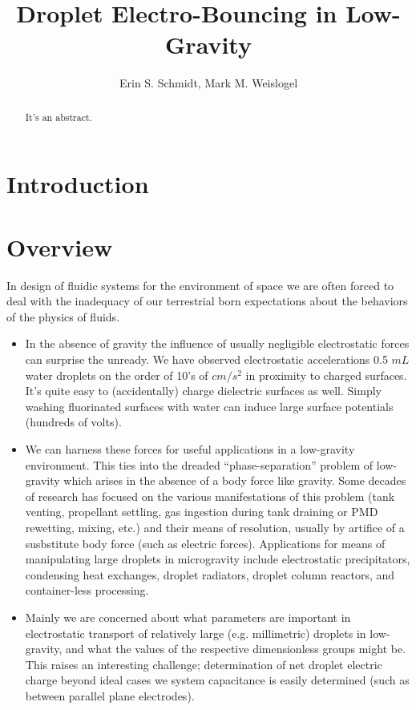 \documentclass[a4paper, 12pt]{article}
\title{\textsf{\textbf{Droplet Electro-Bouncing in Low-Gravity}}}
\author{Erin S. Schmidt, Mark M. Weislogel}
\date{}
\begin{document}
\maketitle

\begin{abstract}
\noindent
It's an abstract.
\end{abstract}
\doublespacing
\section{Introduction}


\section{Overview}
In design of fluidic systems for the environment of space we are often forced to deal with the inadequacy of our terrestrial born expectations about the behaviors of the physics of fluids.   

\begin{itemize}
\item In the absence of gravity the influence of usually negligible electrostatic forces can surprise the unready. We have observed electrostatic accelerations 0.5 $mL$ water droplets on the order of 10's of $cm/s^2$ in proximity to charged surfaces. It's quite easy to (accidentally) charge dielectric surfaces as well. Simply washing fluorinated surfaces with water can induce large surface potentials (hundreds of volts).

\item We can harness these forces for useful applications in a low-gravity environment. This ties into the dreaded ``phase-separation'' problem of low-gravity which arises in the absence of a body force like gravity. Some decades of research has focused on the various manifestations of this problem (tank venting, propellant settling, gas ingestion during tank draining or PMD rewetting, mixing, etc.) and their means of resolution, usually by artifice of a susbstitute body force (such as electric forces). Applications for means of manipulating large droplets in microgravity include electrostatic precipitators, condensing heat exchanges, droplet radiators, droplet column reactors, and container-less processing.

\item Mainly we are concerned about what parameters are important in electrostatic transport of relatively large (e.g. millimetric) droplets in low-gravity, and what the values of the respective dimensionless groups might be. This raises an interesting challenge; determination of net droplet electric charge beyond ideal cases we system capacitance is easily determined (such as between parallel plane electrodes).

\end{itemize}
\end{document}
